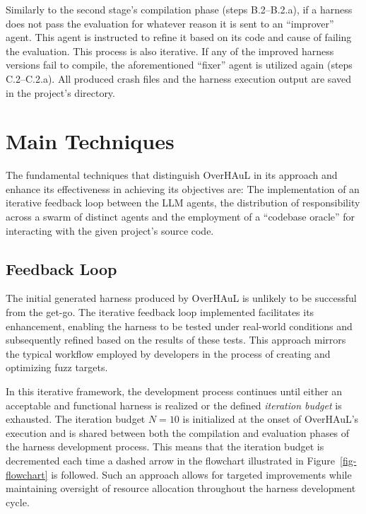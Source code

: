 \documentclass[
  a4paper,
  DIV=11,
  numbers=noendperiod]{scrreprt}
\theoremstyle{definition}
\theoremstyle{remark}
\begin{document}
Similarly to the second stage's compilation phase (steps B.2--B.2.a), if
a harness does not pass the evaluation for whatever reason it is sent to
an ``improver'' agent. This agent is instructed to refine it based on
its code and cause of failing the evaluation. This process is also
iterative. If any of the improved harness versions fail to compile, the
aforementioned ``fixer'' agent is utilized again (steps C.2--C.2.a). All
produced crash files and the harness execution output are saved in the
project's directory.

\section{Main Techniques}\label{sec-techniques}

The fundamental techniques that distinguish OverHAuL in its approach and
enhance its effectiveness in achieving its objectives are: The
implementation of an iterative feedback loop between the LLM agents, the
distribution of responsibility across a swarm of distinct agents and the
employment of a ``codebase oracle'' for interacting with the given
project's source code.

\subsection{Feedback Loop}\label{sec-loop}

The initial generated harness produced by OverHAuL is unlikely to be
successful from the get-go. The iterative feedback loop implemented
facilitates its enhancement, enabling the harness to be tested under
real-world conditions and subsequently refined based on the results of
these tests. This approach mirrors the typical workflow employed by
developers in the process of creating and optimizing fuzz targets.

In this iterative framework, the development process continues until
either an acceptable and functional harness is realized or the defined
\emph{iteration budget} is exhausted. The iteration budget \(N=10\) is
initialized at the onset of OverHAuL's execution and is shared between
both the compilation and evaluation phases of the harness development
process. This means that the iteration budget is decremented each time a
dashed arrow in the flowchart illustrated in Figure~\ref{fig-flowchart}
is followed. Such an approach allows for targeted improvements while
maintaining oversight of resource allocation throughout the harness
development cycle.
\end{document}
